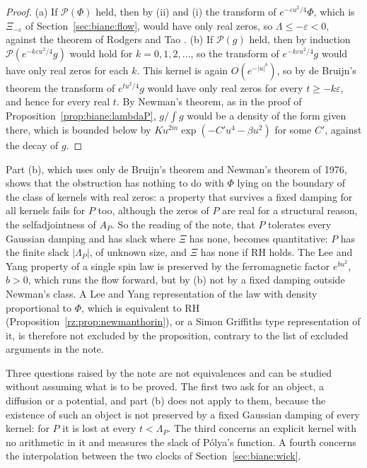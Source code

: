 \begin{proof}
(a) If $\mathcal P(\Phi)$ held, then by (ii) and (i) the transform of $e^{-\varepsilon u^2/4}\Phi$, which is $\Xi_{-\varepsilon}$ of Section~\ref{sec:biane:flow}, would have only real zeros, so $\Lambda\le-\varepsilon<0$, against the theorem of Rodgers and Tao \cite{RodgersTao}. (b) If $\mathcal P(g)$ held, then by induction $\mathcal P(e^{-k\varepsilon u^2/4}g)$ would hold for $k=0,1,2,\dots$, so the transform of $e^{-k\varepsilon u^2/4}g$ would have only real zeros for each $k$. This kernel is again $O(e^{-|u|^b})$, so by de Bruijn's theorem \cite[Theorem~13]{deBruijn} the transform of $e^{tu^2/4}g$ would have only real zeros for every $t\ge-k\varepsilon$, and hence for every real $t$. By Newman's theorem, as in the proof of Proposition~\ref{prop:biane:lambdaP}, $g/\int g$ would be a density of the form given there, which is bounded below by $Ku^{2m}\exp(-C'u^4-\beta u^2)$ for some $C'$, against the decay of $g$.
\end{proof}

Part (b), which uses only de Bruijn's theorem and Newman's theorem of 1976, shows that the obstruction has nothing to do with $\Phi$ lying on the boundary of the class of kernels with real zeros: a property that survives a fixed damping for all kernels fails for $P$ too, although the zeros of $P$ are real for a structural reason, the selfadjointness of $A_P$. So the reading of the note, that $P$ tolerates every Gaussian damping and has slack where $\Xi$ has none, becomes quantitative: $P$ has the finite slack $|\Lambda_P|$, of unknown size, and $\Xi$ has none if RH holds. The Lee and Yang property of a single spin law is preserved by the ferromagnetic factor $e^{bu^2}$, $b>0$, which runs the flow forward, but by (b) not by a fixed damping outside Newman's class. A Lee and Yang representation of the law with density proportional to $\Phi$, which is equivalent to RH (Proposition~\ref{rz:prop:newmanthorin}), or a Simon Griffiths type representation of it, is therefore not excluded by the proposition, contrary to the list of excluded arguments in the note.

Three questions raised by the note are not equivalences and can be studied without assuming what is to be proved. The first two ask for an object, a diffusion or a potential, and part (b) does not apply to them, because the existence of such an object is not preserved by a fixed Gaussian damping of every kernel: for $P$ it is lost at every $t<\Lambda_P$. The third concerns an explicit kernel with no arithmetic in it and measures the slack of P\'olya's function. A fourth concerns the interpolation between the two clocks of Section~\ref{sec:biane:wick}.

